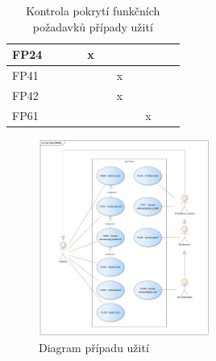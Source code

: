 \begin{table}[p]
\begin{tabular}{l|l|l|l|l|l|l|l|l|l|l}
          \hline
          FP24 &      &      &      & x    &      &      &      &      &      &       \\ 
          \hline
          FP41 &      &      &      &      &      & x    &      &      &      &       \\ 
          \hline
          FP42 &      &      &      &      &      & x    &      &      &      &       \\ 
          \hline
          FP61 &      &      &      &      &      &      &      & x    &      &      
     \end{tabular}
     \caption{Kontrola pokrytí funkčních požadavků případy užití}
     \label{tab:func_req_uc_table} 
\end{table}


\begin{figure}[p]
     \centering
     \includegraphics[width=0.5\textwidth]{assets/use_case_model.png}
     \caption{Diagram případu užití}
     \label{fig:use_case}
\end{figure}